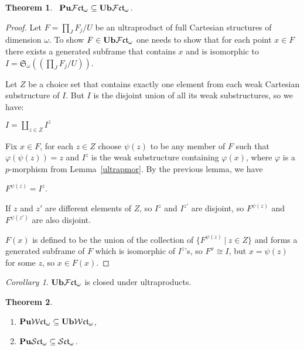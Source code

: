 \documentclass{article}
\theoremstyle{defin}
\theoremstyle{theorem}
\newtheorem{theorem}{Theorem}
\theoremstyle{claim}
\theoremstyle{prop}
\theoremstyle{lemma}
\theoremstyle{fact}
\theoremstyle{remark}
\theoremstyle{ex}
\theoremstyle{col}
\newtheorem{col}{Corollary}
\theoremstyle{question}
\begin{document}
\begin{theorem}~\label{puub}
${\bf Pu}\mathcal{F}\mathfrak{ct}_{\omega} \subseteq {\bf Ub}\mathcal{F}\mathfrak{ct}_{\omega}$.
\end{theorem}

\begin{proof}
Let $F = \prod \limits_J F_j / U$ be an ultraproduct of full Cartesian structures of dimension $\omega$. 
To show $F \in {\bf Ub}\mathcal{F}\mathfrak{ct}_{\omega}$ one needs to show that for each point $x \in F$ 
there exists a generated subframe that contains $x$ and is isomorphic to 
$I = \mathfrak{S}_{\omega}((\prod \limits_J F_j / U))$.

Let $Z$ be a choice set that contains exactly one element from each weak Cartesian substructure of $I$. 
But $I$ is the disjoint union of all its weak substructures, so we have:
\begin{center}
$I = \coprod \limits_{z \in Z} I^z$
\end{center}
Fix $x \in F$, for each $z \in Z$ choose $\psi(z)$ to be any member of $F$ such that 
$\varphi(\psi(z)) = z$ and $I^z$ is the weak substructure containing $\varphi(x)$, 
where $\varphi$ is a $p$-morphism from Lemma~\ref{ultrapmor}. By the previous lemma, we have
\begin{center}
$F^{\psi(z)} = I^z$.
\end{center}

If $z$ and $z'$ are different elements of $Z$, so $I^z$ and $I^{z'}$ are disjoint, 
so $F^{\psi(z)}$ and $F^{\psi(z')}$ are also disjoint. 

$F(x)$ is defined to be the union of the collection of $\{ F^{\psi(z)} \: | \: z \in Z \}$ and 
forms a generated subframe of $F$ which is isomorphic of $I^z$'s, so $F^x \cong I$,
but $x = \psi(z)$ for some $z$, so $x \in F(x)$. 
\end{proof}

\begin{col}
${\bf Ub}\mathcal{F}\mathfrak{ct}_{\omega}$ is closed under ultraproducts.
\end{col}

\begin{theorem}
$ $

\begin{enumerate}
\item ${\bf Pu}\mathcal{W}\mathfrak{ct}_{\omega} \subseteq {\bf Ub}\mathcal{W}\mathfrak{ct}_{\omega}$,
\item ${\bf Pu}\mathcal{S}\mathfrak{ct}_{\omega} \subseteq \mathcal{S}\mathfrak{ct}_{\omega}$.
\end{enumerate}
\end{theorem}
\end{document}
